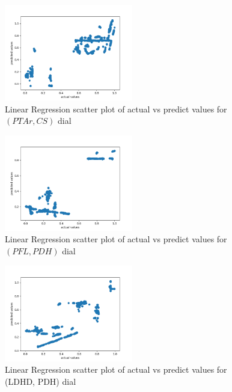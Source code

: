 \documentclass[12pt,chapterheads]{ucsd}
\begin{document}
\begin{figure}[h] 
\centering
\includegraphics[width=0.5\textwidth]{PTAr_CS_lr}
\caption[Linear Regression scatter plot of actual vs predict values for $(PTAr, CS)$ dial]
{Linear Regression scatter plot of actual vs predict values for $(PTAr, CS)$ dial}
\label{fig:PtarCsLr}
\end{figure}

\begin{figure}[h] 
\centering
\includegraphics[width=0.5\textwidth]{PFL_PDH_lr}
\caption[Linear Regression scatter plot of actual vs predict values for $(PFL, PDH)$ dial]
{Linear Regression scatter plot of actual vs predict values for $(PFL, PDH)$ dial}
\label{fig:PflPdhLr}
\end{figure}

\begin{figure}[h] 
\centering
\includegraphics[width=0.5\textwidth]{LDH_D_PDH_lr}
\caption[Linear Regression scatter plot of actual vs predict values for \string(LDH\textunderscore D, PDH) dial]
{Linear Regression scatter plot of actual vs predict values for \string(LDH\textunderscore D, PDH) dial}
\label{fig:LdhPdhLr}
\end{figure}
\end{document}
